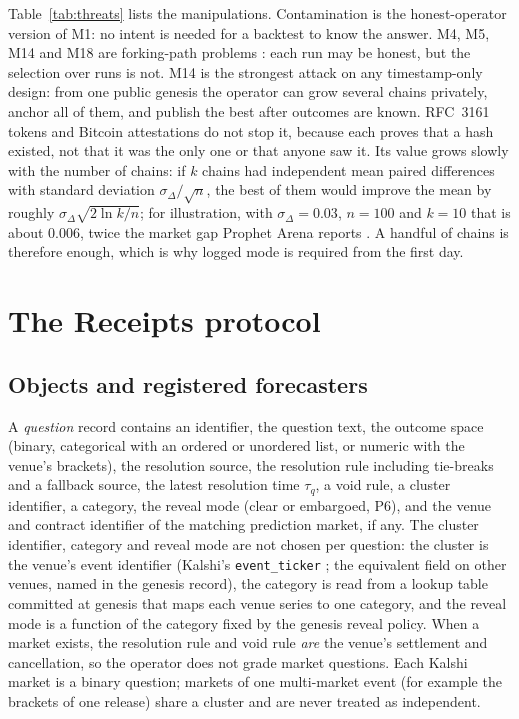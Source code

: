 \documentclass[11pt]{article}
\begin{document}
Table~\ref{tab:threats} lists the manipulations. Contamination is the honest-operator version of M1: no intent is needed for a backtest to know the answer. M4, M5, M14 and M18 are forking-path problems \citep{gelman2014crisis}: each run may be honest, but the selection over runs is not. M14 is the strongest attack on any timestamp-only design: from one public genesis the operator can grow several chains privately, anchor all of them, and publish the best after outcomes are known. RFC~3161 tokens and Bitcoin attestations do not stop it, because each proves that a hash existed, not that it was the only one or that anyone saw it. Its value grows slowly with the number of chains: if $k$ chains had independent mean paired differences with standard deviation $\sigma_\Delta/\sqrt{n}$, the best of them would improve the mean by roughly $\sigma_\Delta\sqrt{2\ln k / n}$; for illustration, with $\sigma_\Delta = 0.03$, $n = 100$ and $k = 10$ that is about $0.006$, twice the market gap Prophet Arena reports \citep{yang2025prophet}. A handful of chains is therefore enough, which is why logged mode is required from the first day.

\section{The Receipts protocol}
\label{sec:protocol}

\subsection{Objects and registered forecasters}

A \emph{question} record contains an identifier, the question text, the outcome space (binary, categorical with an ordered or unordered list, or numeric with the venue's brackets), the resolution source, the resolution rule including tie-breaks and a fallback source, the latest resolution time $\tau_q$, a void rule, a cluster identifier, a category, the reveal mode (clear or embargoed, P6), and the venue and contract identifier of the matching prediction market, if any. The cluster identifier, category and reveal mode are not chosen per question: the cluster is the venue's event identifier (Kalshi's \texttt{event\_ticker} \citep{kalshi_market}; the equivalent field on other venues, named in the genesis record), the category is read from a lookup table committed at genesis that maps each venue series to one category, and the reveal mode is a function of the category fixed by the genesis reveal policy. When a market exists, the resolution rule and void rule \emph{are} the venue's settlement and cancellation, so the operator does not grade market questions. Each Kalshi market is a binary question; markets of one multi-market event (for example the brackets of one release) share a cluster and are never treated as independent.
\end{document}
